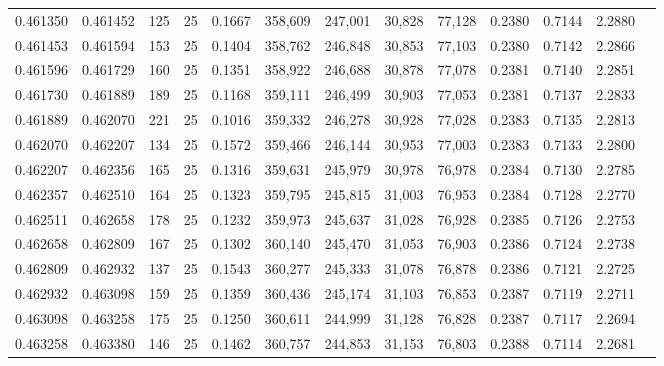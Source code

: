 \begin{tabular}{rrrrrrrrrrrrr}
0.461350 & 0.461452 &   125 &  25 &                                     0.1667 & 358,609 & 247,001 &  30,828 &  77,128 & 0.2380 & 0.7144 & 2.2880 \\
0.461453 & 0.461594 &   153 &  25 &                                     0.1404 & 358,762 & 246,848 &  30,853 &  77,103 & 0.2380 & 0.7142 & 2.2866 \\
0.461596 & 0.461729 &   160 &  25 &                                     0.1351 & 358,922 & 246,688 &  30,878 &  77,078 & 0.2381 & 0.7140 & 2.2851 \\
0.461730 & 0.461889 &   189 &  25 &                                     0.1168 & 359,111 & 246,499 &  30,903 &  77,053 & 0.2381 & 0.7137 & 2.2833 \\
0.461889 & 0.462070 &   221 &  25 &                                     0.1016 & 359,332 & 246,278 &  30,928 &  77,028 & 0.2383 & 0.7135 & 2.2813 \\
0.462070 & 0.462207 &   134 &  25 &                                     0.1572 & 359,466 & 246,144 &  30,953 &  77,003 & 0.2383 & 0.7133 & 2.2800 \\
0.462207 & 0.462356 &   165 &  25 &                                     0.1316 & 359,631 & 245,979 &  30,978 &  76,978 & 0.2384 & 0.7130 & 2.2785 \\
0.462357 & 0.462510 &   164 &  25 &                                     0.1323 & 359,795 & 245,815 &  31,003 &  76,953 & 0.2384 & 0.7128 & 2.2770 \\
0.462511 & 0.462658 &   178 &  25 &                                     0.1232 & 359,973 & 245,637 &  31,028 &  76,928 & 0.2385 & 0.7126 & 2.2753 \\
0.462658 & 0.462809 &   167 &  25 &                                     0.1302 & 360,140 & 245,470 &  31,053 &  76,903 & 0.2386 & 0.7124 & 2.2738 \\
0.462809 & 0.462932 &   137 &  25 &                                     0.1543 & 360,277 & 245,333 &  31,078 &  76,878 & 0.2386 & 0.7121 & 2.2725 \\
0.462932 & 0.463098 &   159 &  25 &                                     0.1359 & 360,436 & 245,174 &  31,103 &  76,853 & 0.2387 & 0.7119 & 2.2711 \\
0.463098 & 0.463258 &   175 &  25 &                                     0.1250 & 360,611 & 244,999 &  31,128 &  76,828 & 0.2387 & 0.7117 & 2.2694 \\
0.463258 & 0.463380 &   146 &  25 &                                     0.1462 & 360,757 & 244,853 &  31,153 &  76,803 & 0.2388 & 0.7114 & 2.2681 \\

\end{tabular}
